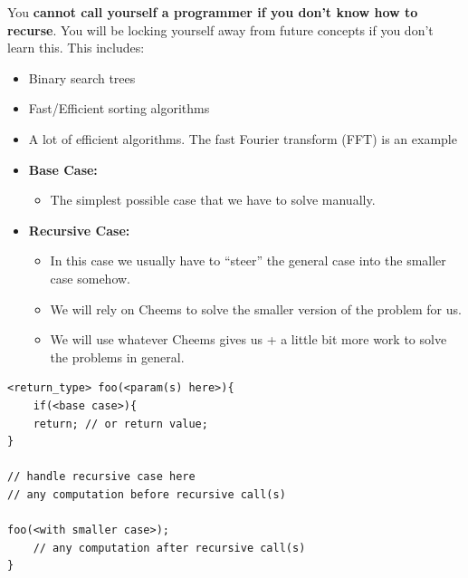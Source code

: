 \documentclass[11pt,a4paper]{article}
\providecommand{\tightlist}{\setlength{\itemsep}{0pt}\setlength{\parskip}{0pt}}
\begin{document}
\label{341-why-recursion}
\hypertarget{341-why-recursion}{}

You \textbf{cannot call yourself a programmer if you don't know how to recurse}. You will be locking yourself away from future concepts if you don't learn this. This includes:

\begin{itemize}
\tightlist
\item
  Binary search trees
\item
  Fast/Efficient sorting algorithms
\item
  A lot of efficient algorithms. The fast Fourier transform (FFT) is an example
\end{itemize}

\label{342-features-of-recursion}
\hypertarget{342-features-of-recursion}{}

\begin{itemize}
\tightlist
\item
  \textbf{Base Case:}

  \begin{itemize}
  \tightlist
  \item
    The simplest possible case that we have to solve manually.
  \end{itemize}
\item
  \textbf{Recursive Case:}

  \begin{itemize}
  \tightlist
  \item
    In this case we usually have to ``steer'' the general case into the smaller case somehow.
  \item
    We will rely on Cheems to solve the smaller version of the problem for us.
  \item
    We will use whatever Cheems gives us + a little bit more work to solve the problems in general.
  \end{itemize}
\end{itemize}

\begin{lstlisting}[style=cscode]
<return_type> foo(<param(s) here>){
    if(<base case>){
    return; // or return value;
}

// handle recursive case here
// any computation before recursive call(s)

foo(<with smaller case>);
    // any computation after recursive call(s)
}
\end{lstlisting}
\end{document}
